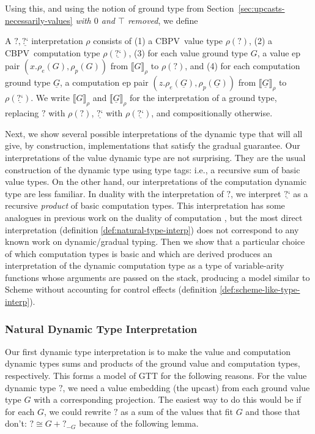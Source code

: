 \documentclass[acmsmall,nonacm]{acmart}
\renewcommand{\u}{\underline}
\newcommand{\cbpv}{CBPV}
\newcommand{\cbpvtxt}{\cbpv}
\newcommand{\sem}[1]{\llbracket#1\rrbracket}
\newcommand{\srho}[1]{\sem{#1}_\rho}
\newcommand{\dynv}{{?}}
\newcommand{\dync}{\u {\text{?`}}}
\begin{document}
Using this, and using the notion of ground type from
Section~\ref{sec:upcasts-necessarily-values} \emph{with $0$ and $\top$ removed}, we define

\begin{definition}
  A $\dynv,\dync$ interpretation $\rho$ consists of (1) a
  \cbpvtxt\ value type $\rho(\dynv)$, (2) a \cbpvtxt\ computation
  type $\rho(\dync)$, 
  (3)
  for each value ground type $G$,
  a value ep pair $(x.\rho_{e}(G), \rho_{p}(G))$ from $\srho G$ to
  $\rho(\dynv)$, and (4) for each computation ground type $\u G$, a
  computation ep pair $(z.\rho_{e}(\u G), \rho_{p}(\u G))$ from
  $\srho{\u G}$ to $\rho(\dync)$.  We write 
  $\srho G$ and $\srho {\u G}$ for the interpretation of a ground type,
  replacing $\dynv$ with $\rho(\dynv)$, $\dync$ with $\rho(\dync)$, and
  compositionally otherwise.
\end{definition}

Next, we show several possible interpretations of the dynamic type
that will all give, by construction, implementations that satisfy the
gradual guarantee.
%
Our interpretations of the value dynamic type are not surprising.
%
They are the usual construction of the dynamic type using type tags:
i.e., a recursive sum of basic value types.
%
On the other hand, our interpretations of the computation dynamic type
are less familiar.
%
In duality with the interpretation of $\dynv$, we interpret $\dync$ as
a recursive \emph{product} of basic computation types.
%
This interpretation has some analogues in previous work on the duality
of computation \citep{girard01locussolum,zeilberger09thesis}, but the
most direct interpretation (definition \ref{def:natural-type-interp})
does not correspond to any known work on dynamic/gradual typing.
%
Then we show that a particular choice of which computation types is
basic and which are derived produces an interpretation of the dynamic
computation type as a type of variable-arity functions whose arguments
are passed on the stack, producing a model similar to Scheme without
accounting for control effects (definition
\ref{def:scheme-like-type-interp}).

\subsubsection{Natural Dynamic Type Interpretation}

Our first dynamic type interpretation is to make the value and
computation dynamic types sums and products of the ground value and
computation types, respectively.
%
This forms a model of GTT for the following reasons.
%
For the value dynamic type $\dynv$, we need a value embedding (the
upcast) from each ground value type $G$ with a corresponding projection.
%
The easiest way to do this would be if for each $G$, we could rewrite
$\dynv$ as a sum of the values that fit $G$ and those that don't:
$\dynv \cong G + \dynv_{-G}$ because of the following lemma.
\end{document}
